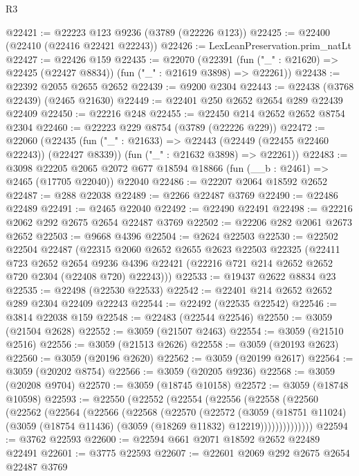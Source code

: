 \begin{lexlean}{R3}
\begin{coremodule}
@22421 := @22223 @123 @9236 (@3789 (@22226 @123))
@22425 := @22400 (@22410 (@22416 @22421 @22243))
@22426 := LexLeanPreservation.prim_natLt
@22427 := @22426 @159
@22435 := @22070
    (@22391 (fun ("_" : @21620) => @22425 (@22427 @8834)) (fun ("_" : @21619 @3898) => @22261))
@22438 := @22392 @2055 @2655 @2652
@22439 := @9200 @2304
@22443 := @22438 (@3768 @22439) (@2465 @21630)
@22449 := @22401 @250 @2652 @2654 @289 @22439 @22409
@22450 := @22216 @248
@22455 := @22450 @214 @2652 @2652 @8754 @2304
@22460 := @22223 @229 @8754 (@3789 (@22226 @229))
@22472 := @22060
    (@22435
      (fun ("_" : @21633) => @22443 (@22449 (@22455 @22460 @22243)) (@22427 @8339))
      (fun ("_" : @21632 @3898) => @22261))
@22483 := @3098
    @22205
    @2065
    @2072
    @677
    @18594
    @18866
    (fun (__b : @2461) => @2465 (@17705 @22040))
    @22040
@22486 := @22207 @2064 @18592 @2652
@22487 := @288 @22038
@22489 := @2266 @22487 @3769
@22490 := @22486 @22489
@22491 := @2465 @22040
@22492 := @22490 @22491
@22498 := @22216 @2062 @292 @2675 @2654 @22487 @3769
@22502 := @22206 @282 @2061 @2673 @2652
@22503 := @9668 @4396
@22504 := @2624 @22503
@22530 := @22502
    @22504
    @22487
    (@22315
      @2060
      @2652
      @2655
      @2623
      @22503
      @22325
      (@22411
        @723
        @2652
        @2654
        @9236
        @4396
        @22421
        (@22216 @721 @214 @2652 @2652 @720 @2304 (@22408 @720) @22243)))
@22533 := @19437 @2622 @8834 @23
@22535 := @22498 (@22530 @22533)
@22542 := @22401 @214 @2652 @2652 @289 @2304 @22409 @22243
@22544 := @22492 (@22535 @22542)
@22546 := @3814 @22038 @159
@22548 := @22483 (@22544 @22546)
@22550 := @3059 (@21504 @2628)
@22552 := @3059 (@21507 @2463)
@22554 := @3059 (@21510 @2516)
@22556 := @3059 (@21513 @2626)
@22558 := @3059 (@20193 @2623)
@22560 := @3059 (@20196 @2620)
@22562 := @3059 (@20199 @2617)
@22564 := @3059 (@20202 @8754)
@22566 := @3059 (@20205 @9236)
@22568 := @3059 (@20208 @9704)
@22570 := @3059 (@18745 @10158)
@22572 := @3059 (@18748 @10598)
@22593 := @22550
    (@22552
      (@22554
        (@22556
          (@22558
            (@22560
              (@22562
                (@22564
                  (@22566
                    (@22568
                      (@22570
                        (@22572
                          (@3059
                            (@18751 @11024)
                            (@3059 (@18754 @11436) (@3059 (@18269 @11832) @12219))))))))))))))
@22594 := @3762 @22593
@22600 := @22594 @661 @2071 @18592 @2652 @22489 @22491
@22601 := @3775 @22593
@22607 := @22601 @2069 @292 @2675 @2654 @22487 @3769

\end{coremodule}
\end{lexlean}
